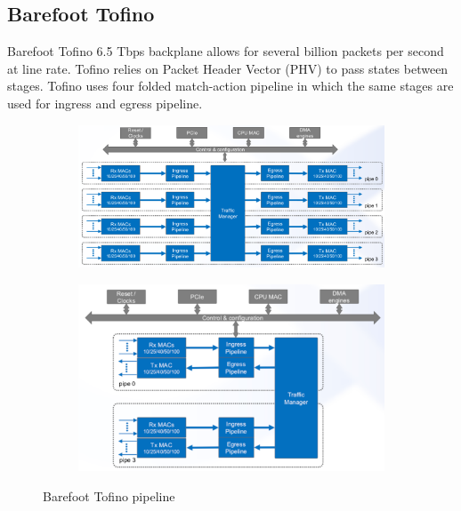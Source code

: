 \documentclass[11pt,oneside,a4paper]{article}
\begin{document}
\subsection{Barefoot Tofino}

Barefoot Tofino 6.5 Tbps backplane allows for several billion packets per second at line rate. Tofino relies on Packet Header Vector (PHV) to pass states between stages. Tofino uses four folded match-action pipeline in which the same stages are used for ingress and egress pipeline.

\begin{figure}[hb]
	\centering
	\begin{subfigure}[t]{.5\textwidth}
		\centering
		\includegraphics[width=\textwidth,scale=1]{figures/tofino_blockdiagram}
		\label{fig:tofino_blockdiagram}
	\end{subfigure}%
	\begin{subfigure}[t]{.5\textwidth}
		\centering
		\includegraphics[width=\textwidth,scale=1]{figures/unified_pipeline}
		\label{fig:unified_pipeline}
	\end{subfigure}
	\caption{Barefoot Tofino pipeline \cite{barefoot}}
\end{figure}
\end{document}
